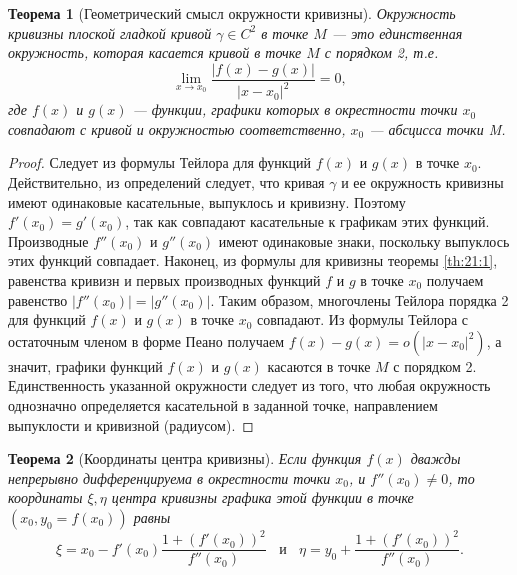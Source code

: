 \documentclass[12pt]{report}
\numberwithin{equation}{section}
\newtheorem{theorem}{Теорема}[section]
\begin{document}
\begin{theorem} [Геометрический смысл окружности кривизны] \label{th:22:1}
Окружность кривизны плоской гладкой кривой $\gamma \in C^2$ в точке $M$ --- это единственная окружность, которая касается кривой в точке $M$ с порядком 2, т.е.
\[ \lim_{x \to x_0} \frac{|f(x) - g(x)|}{|x - x_0|^2} = 0,\] 
где $f(x)$ и $g(x)$ --- функции, графики которых в окрестности точки $x_0$ совпадают с кривой и окружностью соответственно, $x_0$ --- абсцисса точки M.
\end{theorem}
\begin{proof}
Следует из формулы Тейлора для функций $f(x)$ и $g(x)$ в точке $x_0$. Действительно, из определений следует, что кривая $\gamma$ и ее окружность кривизны имеют одинаковые касательные, выпуклось и кривизну. Поэтому $f'(x_0) = g'(x_0)$, так как совпадают касательные к графикам этих функций. Производные $f''(x_0)$ и $g''(x_0)$ имеют одинаковые знаки, поскольку выпуклось этих функций совпадает. Наконец, из формулы для кривизны теоремы \ref{th:21:1}, равенства кривизн и первых производных функций $f$ и $g$ в точке $x_0$ получаем равенство $|f''(x_0)| = |g''(x_0)|$. Таким образом, многочлены Тейлора порядка 2 для функций $f(x)$ и $g(x)$ в точке $x_0$ совпадают. Из формулы Тейлора с остаточным членом в форме Пеано получаем $f(x) - g(x) = o(|x- x_0|^2)$, а значит, графики функций $f(x)$ и $g(x)$ касаются в точке $M$ с порядком 2.\\

Единственность указанной окружности следует из того, что любая окружность однозначно определяется касательной в заданной точке, направлением выпуклости и кривизной (радиусом).
\end{proof}

\begin{theorem}[Координаты центра кривизны]
Если функция $f(x)$ дважды непрерывно дифференцируема в окрестности точки $x_0$, и $f''(x_0) \neq 0$, то координаты $\xi, \eta$ центра кривизны графика этой функции в точке $(x_0,y_0 = f(x_0))$ равны
\begin{equation} \label{eq:22:1}
\xi = x_0 - f'(x_0) \frac{1 + (f'(x_0))^2}{f''(x_0)}~~~~\text{и}~~~~\eta = y_0 + \frac{1 + (f'(x_0))^2}{f''(x_0)}.
\end{equation}
\end{theorem}
\end{document}
